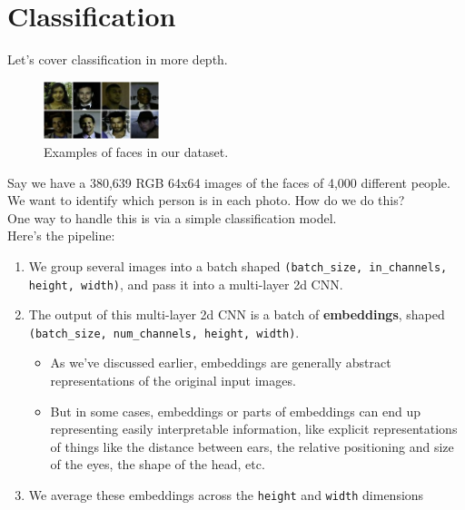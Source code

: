 \documentclass{article}
\newcommand{\ttt}[1]{\texttt{#1}}
\begin{document}
\newpage
\section{Classification}

Let's cover classification in more depth.

\begin{figure}[h]
\centering
\includegraphics[width=0.3\textwidth]{images/out.png}
\caption{Examples of faces in our dataset.}
\end{figure}

Say we have a 380,639 RGB 64x64 images of the faces of 4,000 different people. We want to identify which person is in each photo. How do we do this? \\

One way to handle this is via a simple classification model. \\

Here's the pipeline:

\begin{enumerate}
    \item We group several images into a batch shaped \ttt{(batch\_size, in\_channels, height, width)}, and pass it into a multi-layer 2d CNN.
    \item The output of this multi-layer 2d CNN is a batch of \textbf{embeddings}, shaped \ttt{(batch\_size, num\_channels, height, width)}. 
    \begin{itemize}
        \item As we've discussed earlier, embeddings are generally abstract representations of the original input images.
        \item But in some cases, embeddings or parts of embeddings can end up representing easily interpretable information, like explicit representations of things like the distance between ears, the relative positioning and size of the eyes, the shape of the head, etc. 
    \end{itemize}
    \item We average these embeddings across the \ttt{height} and \ttt{width} dimensions
\end{enumerate}



\end{document}
